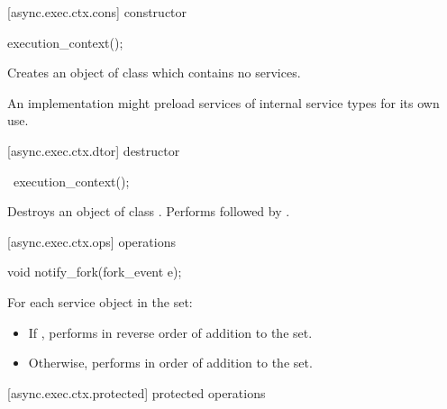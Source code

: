 [async.exec.ctx.cons]{ constructor}

%
\begin{itemdecl}
execution_context();
\end{itemdecl}

\begin{itemdescr}
\pnum
\effects Creates an object of class  which contains no services. \begin{note} An implementation might preload services of internal service types for its own use. \end{note}
\end{itemdescr}



[async.exec.ctx.dtor]{ destructor}

%
\begin{itemdecl}
~execution_context();
\end{itemdecl}

\begin{itemdescr}
\pnum
\effects Destroys an object of class . Performs  followed by .
\end{itemdescr}



[async.exec.ctx.ops]{ operations}

%
\begin{itemdecl}
void notify_fork(fork_event e);
\end{itemdecl}

\begin{itemdescr}
\pnum
\effects For each service object  in the set:
\begin{itemize}
\item
 If , performs  in reverse order of addition to the set.
\item
 Otherwise, performs  in order of addition to the set.
\end{itemize}
\end{itemdescr}



[async.exec.ctx.protected]{ protected operations}

